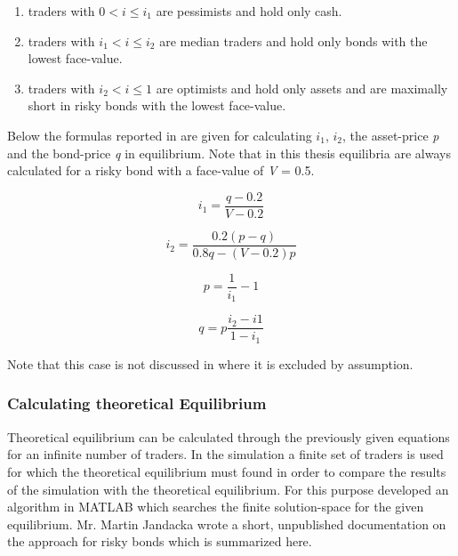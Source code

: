 \documentclass[../Bachelorarbeit.tex]{subfiles}
\begin{document}
\begin{enumerate}
\item traders with $0 < i \leq i_{1}$ are pessimists and hold only cash.
\item traders with $i_{1} < i \leq i_{2}$ are median traders and hold only bonds with the lowest face-value.
\item traders with $i_{2} < i \leq 1$ are optimists and hold only assets and are maximally short in risky bonds with the lowest face-value.
\end{enumerate} 

Below the formulas reported in \cite{Breuer2015} are given for calculating $i_{1}$, $i_{2}$, the asset-price \textit{p} and the bond-price \textit{q} in equilibrium. Note that in this thesis equilibria are always calculated for a risky bond with a face-value of \textit{V} = 0.5.

\begin{equation}
i_{1} = \frac{q - 0.2}{V - 0.2}
\end{equation}

\begin{equation}
i_{2} = \frac{0.2(p - q)}{0.8q - (V - 0.2)p}
\end{equation}

\begin{equation}
p = \frac{1}{i_{1}} - 1
\end{equation}

\begin{equation}
q = p \frac{i_{2} - i{1}}{1 - i_{1}}
\end{equation}

Note that this case is not discussed in \cite{Geanakoplos2009} where it is excluded by assumption.

\subsubsection{Calculating theoretical Equilibrium}
Theoretical equilibrium can be calculated through the previously given equations for an infinite number of traders. In the simulation a finite set of traders is used for which the theoretical equilibrium must found in order to compare the results of the simulation with the theoretical equilibrium. For this purpose \cite{Breuer2015} developed an algorithm in MATLAB which searches the finite solution-space for the given equilibrium. Mr. Martin Jandacka wrote a short, unpublished documentation on the approach for risky bonds which is summarized here.
\end{document}
